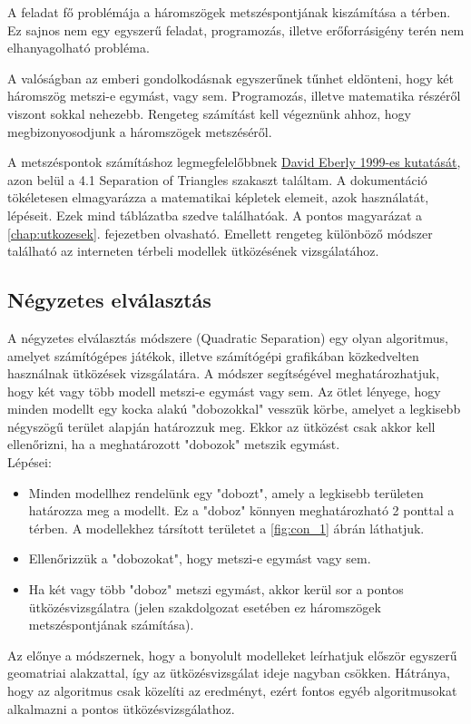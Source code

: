 
A feladat fő problémája a háromszögek metszéspontjának kiszámítása a térben. Ez sajnos nem egy egyszerű feladat, programozás, illetve erőforrásigény terén nem elhanyagolható probléma.

A valóságban az emberi gondolkodásnak egyszerűnek tűnhet eldönteni, hogy két háromszög metszi-e egymást, vagy sem. Programozás, illetve matematika részéről viszont sokkal nehezebb. Rengeteg számítást kell végeznünk ahhoz, hogy megbizonyosodjunk a háromszögek metszéséről.

A metszéspontok számításhoz legmegfelelőbbnek \href{https://www.geometrictools.com/Documentation/DynamicCollisionDetection.pdf}{David Eberly 1999-es kutatását}, azon belül a 4.1 Separation of Triangles \cite{triangles} szakaszt találtam. A dokumentáció tökéletesen elmagyarázza a matematikai képletek elemeit, azok használatát, lépéseit. Ezek mind táblázatba szedve találhatóak. A pontos magyarázat a \ref{chap:utkozesek}. fejezetben olvasható. Emellett rengeteg különböző módszer található az interneten térbeli modellek ütközésének vizsgálatához.\\
\newpage
\subsection{Négyzetes elválasztás}
\label{chap:quad}
A négyzetes elválasztás módszere (Quadratic Separation) egy olyan algoritmus, amelyet számítógépes játékok, illetve számítógépi grafikában közkedvelten használnak ütközések vizsgálatára.
A módszer segítségével meghatározhatjuk, hogy két vagy több modell metszi-e egymást vagy sem.
Az ötlet lényege, hogy minden modellt egy kocka alakú "dobozokkal" vesszük körbe, amelyet a legkisebb négyszögű terület alapján határozzuk meg. Ekkor az ütközést csak akkor kell ellenőrizni, ha a meghatározott "dobozok" metszik egymást.\\
Lépései:
\begin{itemize}
\item Minden modellhez rendelünk egy "dobozt", amely a legkisebb területen határozza meg a modellt. Ez a "doboz" könnyen meghatározható 2 ponttal a térben. A modellekhez társított területet a \ref{fig:con_1} ábrán láthatjuk.

\item Ellenőrizzük a "dobozokat", hogy metszi-e egymást vagy sem.

\item Ha két vagy több "doboz" metszi egymást, akkor kerül sor a pontos ütközésvizsgálatra (jelen szakdolgozat esetében ez háromszögek metszéspontjának számítása).
\end{itemize}
Az előnye a módszernek, hogy a bonyolult modelleket leírhatjuk először egyszerű geomatriai alakzattal, így az ütközésvizsgálat ideje nagyban csökken. Hátránya, hogy az algoritmus csak közelíti az eredményt, ezért fontos egyéb algoritmusokat alkalmazni a pontos ütközésvizsgálathoz.

